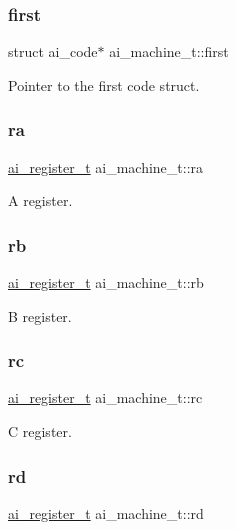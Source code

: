\subsubsection{\texorpdfstring{first}{first}}
{\footnotesize\ttfamily struct ai\+\_\+code$\ast$ ai\+\_\+machine\+\_\+t\+::first}

Pointer to the first code struct. \mbox{\label{structai__machine__t_a51fca59a316b5e5d33e4f73fd83f2a14}} 
\subsubsection{\texorpdfstring{ra}{ra}}
{\footnotesize\ttfamily \hyperlink{machine_8h_a74ebfc967a5948f22ad4c9dffa32c233}{ai\+\_\+register\+\_\+t} ai\+\_\+machine\+\_\+t\+::ra}

A register. \mbox{\label{structai__machine__t_a21915af77692f8928820333544ef7e09}} 
\subsubsection{\texorpdfstring{rb}{rb}}
{\footnotesize\ttfamily \hyperlink{machine_8h_a74ebfc967a5948f22ad4c9dffa32c233}{ai\+\_\+register\+\_\+t} ai\+\_\+machine\+\_\+t\+::rb}

B register. \mbox{\label{structai__machine__t_a40399a0935ea85fde6add5674e5eb842}} 
\subsubsection{\texorpdfstring{rc}{rc}}
{\footnotesize\ttfamily \hyperlink{machine_8h_a74ebfc967a5948f22ad4c9dffa32c233}{ai\+\_\+register\+\_\+t} ai\+\_\+machine\+\_\+t\+::rc}

C register. \mbox{\label{structai__machine__t_a8e167d72ded50101fdd73c000cf9935d}} 
\subsubsection{\texorpdfstring{rd}{rd}}
{\footnotesize\ttfamily \hyperlink{machine_8h_a74ebfc967a5948f22ad4c9dffa32c233}{ai\+\_\+register\+\_\+t} ai\+\_\+machine\+\_\+t\+::rd}


